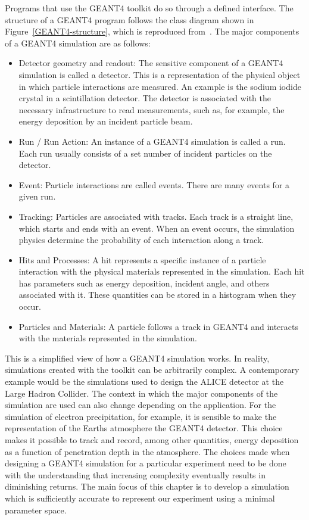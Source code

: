 Programs that use the GEANT4 toolkit do so through a defined interface. The structure of a GEANT4 program follows the class diagram shown in Figure~\ref{GEANT4-structure}, which is reproduced from~\citet{Pfeier:519005}. The major components of a GEANT4 simulation are as follows:

\begin{itemize}
\item Detector geometry and readout: The sensitive component of a GEANT4 simulation is called a detector. This is a representation of the physical object in which particle interactions are measured. An example is the sodium iodide crystal in a scintillation detector. The detector is associated with the necessary infrastructure to read measurements, such as, for example, the energy deposition by an incident particle beam.
\item Run / Run Action: An instance of a GEANT4 simulation is called a run. Each run usually consists of a set number of incident particles on the detector.
\item Event: Particle interactions are called events. There are many events for a given run.
\item Tracking: Particles are associated with tracks. Each track is a straight line, which starts and ends with an event. When an event occurs, the simulation physics determine the probability of each interaction along a track.
\item Hits and Processes: A hit represents a specific instance of a particle interaction with the physical materials represented in the simulation. Each hit has parameters such as energy deposition, incident angle, and others associated with it. These quantities can be stored in a histogram when they occur. 
\item Particles and Materials: A particle follows a track in GEANT4 and interacts with the materials represented in the simulation. 
\end{itemize}
 
This is a simplified view of how a GEANT4 simulation works. In reality, simulations created with the toolkit can be arbitrarily complex. A contemporary example would be the simulations used to design the ALICE detector at the Large Hadron Collider. The context in which the major components of the simulation are used can also change depending on the application. For the simulation of electron precipitation, for example, it is sensible to make the representation of the Earths atmosphere the GEANT4 detector. This choice makes it possible to track and record, among other quantities, energy deposition as a function of penetration depth in the atmosphere. The choices made when designing a GEANT4 simulation for a particular experiment need to be done with the understanding that increasing complexity eventually results in diminishing returns. The main focus of this chapter is to develop a simulation which is sufficiently accurate to represent our experiment using a minimal parameter space. 

